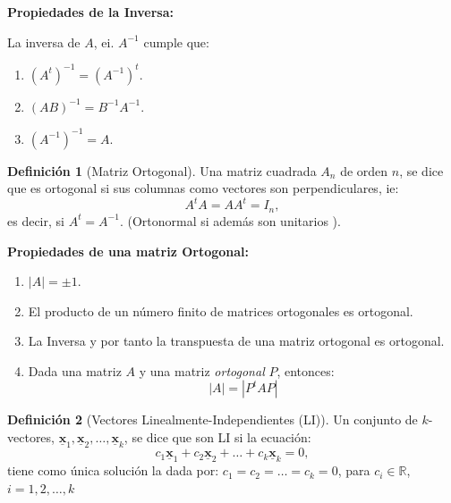 \documentclass[
]{book}
\theoremstyle{definition}
\newtheorem{definition}{Definición}[chapter]
\theoremstyle{definition}
\theoremstyle{definition}
\theoremstyle{definition}
\theoremstyle{remark}
\begin{document}
\textbf{Propiedades de la Inversa:}

La inversa de \(A\), ei. \(A^{-1}\) cumple que:

\begin{enumerate}
\def\labelenumi{\alph{enumi}.}
\item
  \((A^t)^{-1}=(A^{-1})^t\).
\item
  \((AB)^{-1}=B^{-1}A^{-1}\).
\item
  \((A^{-1})^{-1}=A\).
\end{enumerate}

\begin{definition}[Matriz Ortogonal]
\protect\hypertarget{def:matriz-ortog}{}\label{def:matriz-ortog}Una matriz cuadrada \(A_n\) de orden \(n\), se dice que es ortogonal si sus columnas como vectores son perpendiculares, ie:
\[
A^tA=AA^t=I_n,
\]
es decir, si \(A^t=A^{-1}\). (Ortonormal si además son unitarios ).
\end{definition}

\textbf{Propiedades de una matriz Ortogonal:}

\begin{enumerate}
\def\labelenumi{\alph{enumi}.}
\item
  \(|A|=\pm 1\).
\item
  El producto de un número finito de matrices ortogonales es ortogonal.
\item
  La Inversa y por tanto la transpuesta de una matriz ortogonal es ortogonal.
\item
  Dada una matriz \(A\) y una matriz \textit{ortogonal} \(P\), entonces:
  \[
  |A|=|P^tAP|
  \]
\end{enumerate}

\begin{definition}[Vectores Linealmente-Independientes (LI)]
\protect\hypertarget{def:vectores-li}{}\label{def:vectores-li}Un conjunto de \(k\)-vectores, \(\underline{\mathbf{x}}_1,\underline{\mathbf{x}}_2,\ldots,\underline{\mathbf{x}}_k\), se dice que son LI si la ecuación:
\[
c_1\underline{\mathbf{x}}_1+c_2\underline{\mathbf{x}}_2+\ldots+c_k\underline{\mathbf{x}}_k=0,
\]
tiene como única solución la dada por: \(c_1=c_2=\ldots=c_k=0\), para \(c_i \in \mathbb{R}\), \(i=1,2,\ldots,k\)
\end{definition}
\end{document}
